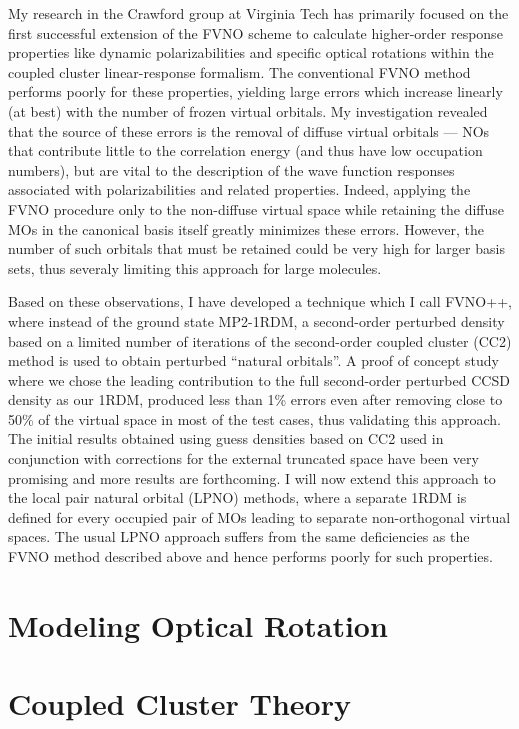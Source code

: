\documentclass[12pt]{report}
\begin{document}
My research in the Crawford group at Virginia Tech has primarily focused on
the first successful extension of the FVNO scheme to calculate higher-order
response properties like dynamic polarizabilities and specific optical
rotations within the coupled cluster linear-response formalism. The
conventional FVNO method performs poorly for these properties, yielding large
errors which increase linearly (at best) with the number of frozen virtual
orbitals.\cite{Kumar17} My investigation revealed that the source of these
errors is the removal of diffuse virtual orbitals --- NOs that contribute
little to the correlation energy (and thus have low occupation numbers), but
are vital to the description of the wave function responses associated with
polarizabilities and related properties.  Indeed, applying the FVNO procedure
only to the non-diffuse virtual space while retaining the diffuse MOs in the
canonical basis itself greatly minimizes these errors.  However, the number 
of such orbitals that must be retained could be very high for larger basis
sets, thus severaly limiting this approach for large molecules.  

Based on these observations, I have developed a technique which I call FVNO++,
where instead of the ground state MP2-1RDM, a second-order perturbed density
based on a limited number of iterations of the second-order coupled cluster
(CC2) method is used to obtain perturbed ``natural orbitals''. A proof of
concept study where we chose the leading contribution to the full second-order
perturbed CCSD density as our 1RDM, produced less than 1\% errors even after
removing close to 50\% of the virtual space in most of the test cases, thus
validating this approach. The initial results obtained using guess densities
based on CC2 used in conjunction with corrections for the external truncated
space have been very promising and more results are forthcoming.
I will now extend this approach to the local pair natural orbital (LPNO)
methods, where a separate 1RDM is defined for every occupied pair of MOs
leading to separate non-orthogonal virtual spaces. The usual LPNO approach
suffers from the same deficiencies as the FVNO method described above and hence
performs poorly for such properties.\cite{McAlexander15:LRCC}
\chapter{Modeling Optical Rotation}
\chapter{Coupled Cluster Theory}
\end{document}
